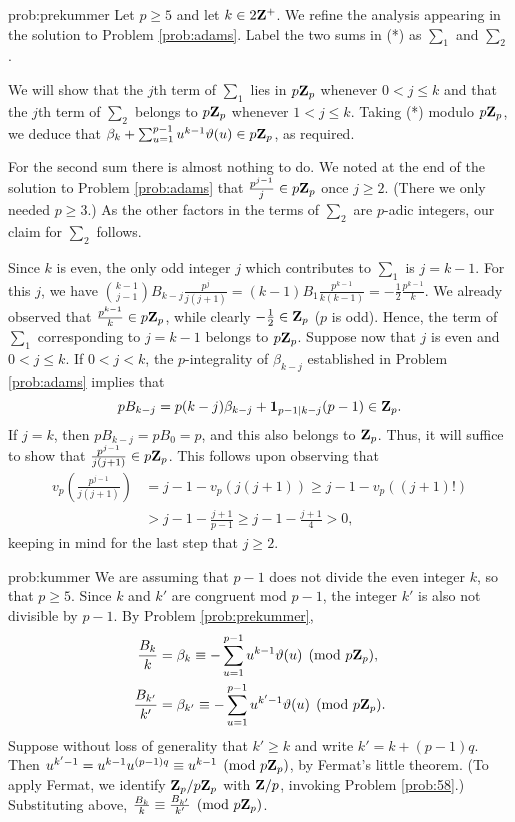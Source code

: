 \begin{sol}{prob:prekummer} Let $p\ge 5$ and let $k\in 2\mathbf{Z}^{+}$. We refine the analysis appearing in the solution to Problem \ref{prob:adams}. Label the two sums in (*) as $\sum_1$ and $\sum_2$.

We will show that the $j$th term of $\sum_1$ lies in $p\mathbf{Z}_{p}$ whenever $0 < j \le k$ and that the $j$th term of $\sum_2$ belongs to $p\mathbf{Z}_{p}$ whenever $1 < j \le k$. Taking (*) modulo $p\mathbf{Z}_{p}$, we deduce that $\beta_k + \sum_{u=1}^{p-1}u^{k-1}\vartheta(u)\in p\mathbf{Z}_{p}$, as required.

For the second sum there is almost nothing to do. We noted at the end of the solution to Problem \ref{prob:adams} that $\frac{p^{j-1}}{j} \in p\mathbf{Z}_{p}$ once $j\ge 2$. (There we only needed $p\ge 3$.) As the other factors in the terms of $\sum_2$ are $p$-adic integers, our claim for $\sum_2$ follows.

Since $k$ is even, the only odd integer $j$ which contributes to $\sum_1$ is $j=k-1$. For this $j$, we have $\binom{k-1}{j-1} B_{k-j} \frac{p^j}{j(j+1)} = (k-1)B_1 \frac{p^{k-1}}{k(k-1)} = -\frac{1}{2}\frac{p^{k-1}}{k}$. We already observed that $\frac{p^{k-1}}{k} \in p\mathbf{Z}_{p}$, while clearly $-\frac{1}{2} \in \mathbf{Z}_p$ ($p$ is odd). Hence, the term of $\sum_1$ corresponding to $j=k-1$ belongs to $p\mathbf{Z}_{p}$. Suppose now that $j$ is even and $0 < j \le k$. If $0 < j < k$, the $p$-integrality of $\beta_{k-j}$ established in Problem \ref{prob:adams} implies that
\[ pB_{k-j} = p(k-j)\beta_{k-j} + \mathbf{1}_{p-1\mid k-j}(p-1) \in \mathbf{Z}_{p}. \]
If $j=k$, then $pB_{k-j} = pB_{0} = p$, and this also belongs to $\mathbf{Z}_p$. Thus, it will suffice to show that $\frac{p^{j-1}}{j(j+1)} \in p\mathbf{Z}_{p}$. This follows upon observing that
\begin{align*}
v_p\left(\frac{p^{j-1}}{j(j+1)}\right)  &= j-1 - v_p(j(j+1)) \ge j-1 - v_p((j+1)!) \\
&> j-1 - \frac{j+1}{p-1} \ge j-1-\frac{j+1}{4} > 0,
\end{align*}
keeping in mind for the last step that $j\ge 2$.
\end{sol}

\begin{sol}{prob:kummer}  We are assuming that $p-1$ does not divide the even integer $k$, so that $p\ge 5$. Since $k$ and $k'$ are congruent mod $p-1$, the integer $k'$ is also not divisible by $p-1$. By Problem \ref{prob:prekummer}, 
\begin{align*} \frac{B_k}{k} &= \beta_k \equiv -\sum_{u=1}^{p-1} u^{k-1}\vartheta(u) \pmod{p\mathbf{Z}_{p}}, \\ \frac{B_{k'}}{k'} &= \beta_{k'} \equiv -\sum_{u=1}^{p-1} u^{k'-1}\vartheta(u) \pmod{p\mathbf{Z}_{p}}. \end{align*}
Suppose without loss of generality that $k'\ge k$ and write $k' = k + (p-1)q$. Then $u^{k'-1} = u^{k-1} u^{(p-1)q} \equiv u^{k-1}\pmod{p\mathbf{Z}_p}$, by Fermat's little theorem. (To apply Fermat, we identify $\mathbf{Z}_p/p\mathbf{Z}_p$ with $\mathbf{Z}/p$, invoking Problem \ref{prob:58}.) Substituting above, $\frac{B_k}{k} \equiv \frac{B_{k'}}{k'}\pmod{p\mathbf{Z}_{p}}$.\end{sol}

